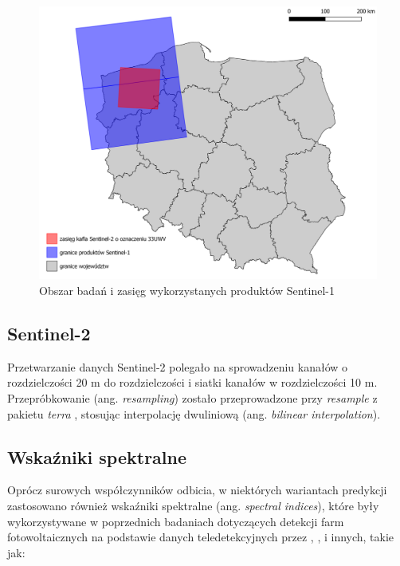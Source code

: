 \documentclass{amuthesis}
\begin{document}
\begin{figure}[t]

{\centering \includegraphics[width=1\textwidth,height=\textheight]{figures/sen1_extents.png}

}

\caption{\label{fig-rycina-s1-extents}Obszar badań i zasięg
wykorzystanych produktów Sentinel-1}

\end{figure}

\hypertarget{sec-processing-s2}{%
\subsection{Sentinel-2}\label{sec-processing-s2}}

Przetwarzanie danych Sentinel-2 polegało na sprowadzeniu kanałów o
rozdzielczości 20 m do rozdzielczości i siatki kanałów w rozdzielczości
10 m. Przepróbkowanie (ang. \emph{resampling}) zostało przeprowadzone
przy \emph{resample} z pakietu \emph{terra} \autocite{R-terra}, stosując
interpolację dwuliniową (ang. \emph{bilinear interpolation}).

\hypertarget{sec-spectral-indices}{%
\subsection{Wskaźniki spektralne}\label{sec-spectral-indices}}

Oprócz surowych współczynników odbicia, w niektórych wariantach
predykcji zastosowano również wskaźniki spektralne (ang. \emph{spectral
indices}), które były wykorzystywane w poprzednich badaniach dotyczących
detekcji farm fotowoltaicznych na podstawie danych teledetekcyjnych
przez \textcite{zhang_2021_texture}, \textcite{plakman_2022_pv},
\textcite{wang_2022_pv} i innych, takie jak:
\end{document}
